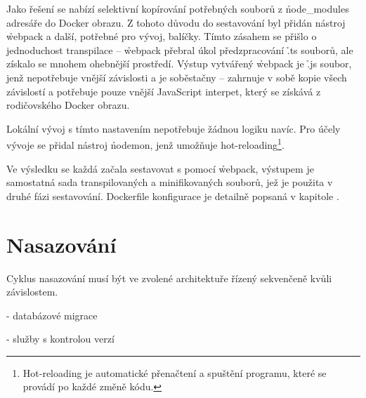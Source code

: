 Jako řešení se nabízí selektivní kopírování potřebných souborů z \h{node\_modules} adresáře do Docker obrazu.
Z tohoto důvodu do sestavování  byl přidán nástroj \h{webpack} a další, potřebné pro vývoj, balíčky.
Tímto zásahem se přišlo o jednoduchost transpilace – \h{webpack} přebral úkol předzpracování \h{.ts} souborů, ale získalo se mnohem ohebnější prostředí.
Výstup vytvářený \h{webpack} je \h{.js} soubor, jenž nepotřebuje vnější závislosti a je soběstačny – zahrnuje v sobě kopie všech závislostí a potřebuje pouze vnější JavaScript interpet, který se získává z rodičovského Docker obrazu.

Lokální vývoj s tímto nastavením nepotřebuje žádnou logiku navíc.
Pro účely vývoje se přidal nástroj \h{nodemon}, jenž umožňuje hot-reloading\footnote{Hot-reloading je automatické přenačtení a spuštění programu, které se provádí po každé změně kódu.}.

Ve výsledku se každá  začala sestavovat s pomocí \h{webpack}, výstupem je samostatná sada transpilovaných a minifikovaných souborů, jež je použita v druhé fázi sestavování.
Dockerfile konfigurace je detailně popsaná v kapitole .



\section{Nasazování}\label{sec:server-deployment}

Cyklus nasazování musí být ve zvolené architektuře řízený sekvenčeně kvůli závislostem.

- databázové migrace

- služby s kontrolou verzí
